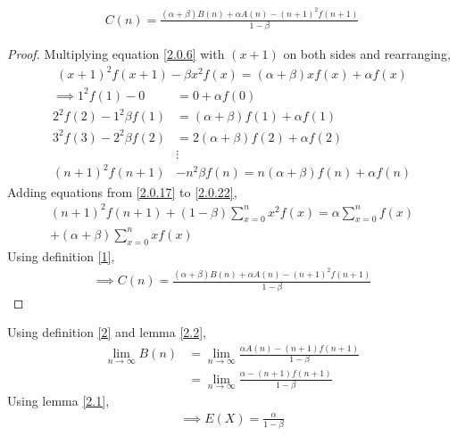 \documentclass[journal,12pt,twocolumn]{IEEEtran}
\begin{document}
\begin{lemma}
\label{2.3}
    \begin{align}
        C(n)=\frac{(\alpha+\beta)B(n)+\alpha A(n)-(n+1)^2f(n+1)}{1-\beta}
    \end{align}
\end{lemma}
\begin{proof}
    Multiplying equation \eqref{2.0.6} with $(x+1)$ on both sides and rearranging,
    \begin{align}
        (x+1)^2f(x+1)-\beta x^2f(x)=(\alpha+\beta)xf(x)+\alpha f(x)
    \end{align}
    \begin{align}
        \implies 1^2f(1)-0&=0+\alpha f(0)\label{2.0.17}\\
        2^2f(2)-1^2\beta f(1)&=(\alpha+\beta)f(1)+\alpha f(1)\\
        3^2f(3)-2^2\beta f(2)&=2(\alpha+\beta)f(2)+\alpha f(2)\\
        &\vdots\\
        (n+1)^2f(n+1)&-n^2\beta f(n)=n(\alpha+\beta)f(n)+\alpha f(n)\label{2.0.22}
    \end{align}
    Adding equations from \eqref{2.0.17} to \eqref{2.0.22},
    \begin{multline}
        (n+1)^2f(n+1)+(1-\beta)\sum_{x=0}^nx^2f(x)=\alpha\sum_{x=0}^nf(x)\\+(\alpha+\beta)\sum_{x=0}^nxf(x)\label{2.0.25}
    \end{multline}
    Using definition \eqref{1},
    \begin{align}
        \implies C(n)=\frac{(\alpha+\beta)B(n)+\alpha A(n)-(n+1)^2f(n+1)}{1-\beta}
    \end{align}
\end{proof}

Using definition \eqref{2} and lemma \eqref{2.2}, 
\begin{align}
    \lim_{n\to\infty}B(n)&=\lim_{n\to\infty}\frac{\alpha A(n)-(n+1)f(n+1)}{1-\beta}\\
    &=\lim_{n\to\infty}\frac{\alpha-(n+1)f(n+1)}{1-\beta}
\end{align}
Using lemma \eqref{2.1},
\begin{align}
    \boxed{\implies E(X)=\frac{\alpha}{1-\beta}}\label{2.0.31}
\end{align}
\end{document}
